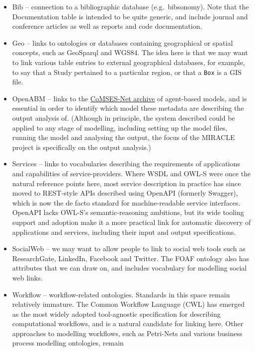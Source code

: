 \documentclass[
]{article}
\begin{document}
\begin{itemize}
\item
  Bib -- connection to a bibliographic database (e.g.~bibsonomy). Note
  that the Documentation table is intended to be quite generic, and
  include journal and conference articles as well as reports and code
  documentation.
\item
  Geo -- links to ontologies or databases containing geographical or
  spatial concepts, such as GeoSparql and WGS84. The idea here is that
  we may want to link various table entries to external geographical
  databases, for example, to say that a Study pertained to a particular
  region, or that a \texttt{Box} is a GIS file.
\item
  OpenABM -- links to the
  \href{https://www.comses.net/codebases/}{CoMSES-Net archive} of
  agent-based models, and is essential in order to identify which model
  these metadata are describing the output analysis of. (Although in
  principle, the system described could be applied to any stage of
  modelling, including setting up the model files, running the model and
  analysing the output, the focus of the MIRACLE project is specifically
  on the output analysis.)
\item
  Services -- links to vocabularies describing the requirements of
  applications and capabilities of service-providers. Where WSDL and
  OWL-S were once the natural reference points here, most service
  description in practice has since moved to REST-style APIs described
  using OpenAPI (formerly Swagger), which is now the de facto standard
  for machine-readable service interfaces. OpenAPI lacks OWL-S's
  semantic-reasoning ambitions, but its wide tooling support and
  adoption make it a more practical link for automatic discovery of
  applications and services, including their input and output
  specifications.
\item
  SocialWeb -- we may want to allow people to link to social web tools
  such as ResearchGate, LinkedIn, Facebook and Twitter. The FOAF
  ontology also has attributes that we can draw on, and includes
  vocabulary for modelling social web links.
\item
  Workflow -- workflow-related ontologies. Standards in this space
  remain relatively immature. The Common Workflow Language (CWL) has
  emerged as the most widely adopted tool-agnostic specification for
  describing computational workflows, and is a natural candidate for
  linking here. Other approaches to modelling workflows, such as
  Petri-Nets and various business process modelling ontologies, remain

\end{itemize}
\end{document}
